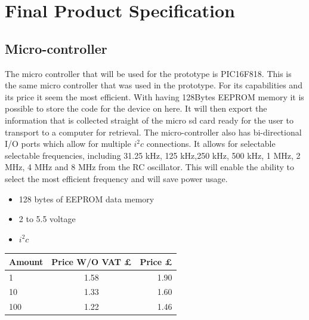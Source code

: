 \documentclass{report}
\begin{document}
\section{Final Product Specification}

\subsection{Micro-controller}
The micro controller that will be used for the prototype is PIC16F818. This is the same micro controller that was used in the prototype. For its capabilities and its price it seem the most efficient. With having 128Bytes EEPROM memory it is possible to store the code for the device on here. It will then export the information that is collected straight of the micro sd card ready for the user to transport to a computer for retrieval. The micro-controller also has bi-directional I/O ports which allow for multiple $i^2c$ connections. It allows for selectable selectable frequencies, including 31.25 kHz, 125 kHz,250 kHz, 500 kHz, 1 MHz, 2 MHz, 4 MHz and 8 MHz from the RC oscillator. This will enable the ability to select the most efficient frequency and will save power usage. 
\begin{itemize}
\item 128 bytes of EEPROM data memory
\item 2 to 5.5 voltage
\item $i^2c$
\end{itemize}
\begin{center}
  \begin{tabular}{ | l | c | r |}
    \hline
    Amount & Price W/O VAT £ & Price £ \\ \hline
    1 & 1.58 & 1.90 \\ \hline
    10 & 1.33 & 1.60 \\ \hline
    100 & 1.22 & 1.46   \\ \hline
  \end{tabular}
\end{center}
\end{document}
